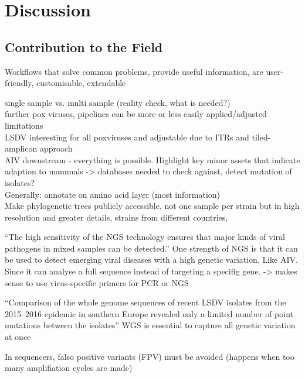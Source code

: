 \chapter{Discussion}\label{chap:discussion}
\todoit

\section{Contribution to the Field}
\todoit
Workflows that solve common problems, provide useful information, are user-friendly, customisable, extendable

single sample vs. multi sample (reality check, what is needed?) \\
further pox viruses, pipelines can be more or less easily applied/adjusted \\
limitations \\
\ac{LSDV} interesting for all poxviruses and adjustable due to \acp{ITR} and tiled-amplicon approach \\
\ac{AIV} downstream - everything is possible. Highlight key minor assets that indicate adaption to mammals -> databases needed to check against, detect mutation of isolates? \\
Generally: annotate on amino acid layer (most information) \\

Make phylogenetic trees publicly accessible, not one sample per strain but in high resolution and greater details, strains from different countries,

``The high sensitivity of the \ac{NGS} technology ensures that major kinds of viral pathogens in mixed samples can be detected.''
One strength of \ac{NGS} is that it can be used to detect emerging viral diseases with a high genetic variation. Like \ac{AIV}. Since it can analyse a full sequence instead of targeting a specifig gene. -> makes sense to use virus-specific primers for \ac{PCR} or \ac{NGS} 

``Comparison of the whole genome sequences of recent \ac{LSDV} isolates from the 2015–2016 epidemic in southern Europe revealed only a limited number of point mutations between the isolates'' \ac{WGS} is essential to capture all genetic variation at once

In sequencers, falso positive variants (\ac{FPV}) must be avoided (happens when too many amplifiation cycles are made)



